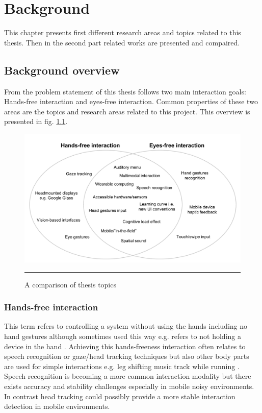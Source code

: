 \chapter{Background}
This chapter presents first different research areas and topics related to this thesis. Then in the second part related works are presented and compaired.


\section{Background overview}
From the problem statement of this thesis follows two main interaction goals: Hands-free interaction and eyes-free interaction. Common properties of these two areas are the topics and research areas related to this project. This overview is presented in fig. \ref{fig:venn}.

\begin{figure}[htbp]
	\centering
		\includegraphics[width=\textwidth,height=\textheight,keepaspectratio]{./Figures/venn-diagram.pdf}
		\rule{35em}{0.5pt}
	\caption[Venn diagram]{A comparison of thesis topics}
	\label{fig:venn}
\end{figure}

\subsection{Hands-free interaction}
This term refers to controlling a system without using the hands including no hand gestures although sometimes used this way e.g. refers to not holding a device in the hand \cite{witt_designing_2006}. Achieving this hands-freeness interaction often relates to speech recognition or gaze/head tracking techniques but also other body parts are used for simple interactions e.g. leg shifting music track while running \cite{smus_running_2010}. Speech recognition is becoming a more common interaction modality but there exists accuracy and stability challenges especially in mobile noisy environments. In contrast head tracking could possibly provide a more stable interaction detection in mobile environments.

